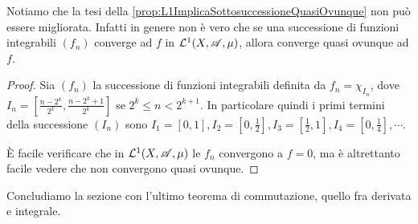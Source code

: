 \begin{remark}
	Notiamo che la tesi della \cref{prop:L1ImplicaSottosuccessioneQuasiOvunque} non può essere migliorata. Infatti in genere non è vero che se una successione di funzioni integrabili $(f_n)$ converge ad $f$ in $\mathcal L^1(X,\mathscr A,\mu)$, allora converge quasi ovunque ad $f$.
\end{remark}
\begin{proof}
	Sia $(f_n)$ la successione di funzioni integrabili definita da $f_n=\chi_{I_n}$, dove $I_n=\left[\frac{n-2^k}{2^k},\frac{n-2^k+1}{2^k}\right]$ se $2^k\le n<2^{k+1}$. In particolare quindi i primi termini della successione $(I_n)$ sono $I_1=\left[0,1\right],I_2=\left[0,\frac 12\right],I_3=\left[\frac 12,1\right],I_4=\left[0,\frac 14\right],\cdots$. 
	
	È facile verificare che in $\mathcal L^1(X,\mathscr A,\mu)$ le $f_n$ convergono a $f=0$, ma è altrettanto facile vedere che non convergono quasi ovunque.
\end{proof}

Concludiamo la sezione con l'ultimo teorema di commutazione, quello fra derivata e integrale.

